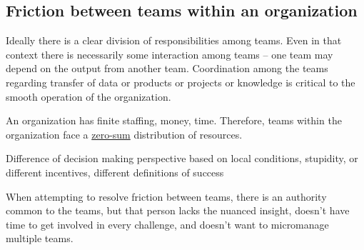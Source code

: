\subsection*{Friction between teams within an organization}

Ideally there is a clear division of responsibilities among teams. Even in that context there is necessarily some interaction among teams -- one team may depend on the output from another team. Coordination among the teams regarding transfer of data or products or projects or knowledge is critical to the smooth operation of the organization. 

An organization has finite staffing, money, time. Therefore, teams within the organization face a \href{https://en.wikipedia.org/wiki/Zero-sum_game}{zero-sum}
distribution of resources.

Difference of decision making perspective based on local conditions, stupidity, or different incentives, different definitions of success

When attempting to resolve friction between teams, there is an authority common to the teams, but that person lacks the nuanced insight, doesn't have time to get involved in every challenge, and doesn't want to micromanage multiple teams.